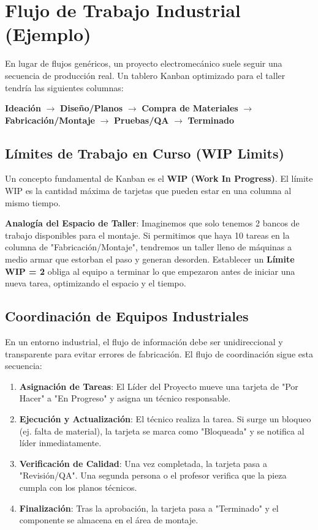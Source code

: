 \documentclass[../main]{subfiles}
\begin{document}
\section{Flujo de Trabajo Industrial (Ejemplo)}

En lugar de flujos genéricos, un proyecto electromecánico suele seguir una secuencia de producción real. Un tablero Kanban optimizado para el taller tendría las siguientes columnas:

\begin{center}
\textbf{Ideación} $\rightarrow$ \textbf{Diseño/Planos} $\rightarrow$ \textbf{Compra de Materiales} $\rightarrow$ \textbf{Fabricación/Montaje} $\rightarrow$ \textbf{Pruebas/QA} $\rightarrow$ \textbf{Terminado}
\end{center}

\subsection{Límites de Trabajo en Curso (WIP Limits)}

Un concepto fundamental de Kanban es el \textbf{WIP (Work In Progress)}. El límite WIP es la cantidad máxima de tarjetas que pueden estar en una columna al mismo tiempo.

\textbf{Analogía del Espacio de Taller}: Imaginemos que solo tenemos 2 bancos de trabajo disponibles para el montaje. Si permitimos que haya 10 tareas en la columna de "Fabricación/Montaje", tendremos un taller lleno de máquinas a medio armar que estorban el paso y generan desorden. Establecer un \textbf{Límite WIP = 2} obliga al equipo a terminar lo que empezaron antes de iniciar una nueva tarea, optimizando el espacio y el tiempo.

\subsection{Coordinación de Equipos Industriales}
En un entorno industrial, el flujo de información debe ser unidireccional y transparente para evitar errores de fabricación. El flujo de coordinación sigue esta secuencia:
\begin{enumerate}
    \item \textbf{Asignación de Tareas}: El Líder del Proyecto mueve una tarjeta de "Por Hacer" a "En Progreso" y asigna un técnico responsable.
    \item \textbf{Ejecución y Actualización}: El técnico realiza la tarea. Si surge un bloqueo (ej. falta de material), la tarjeta se marca como "Bloqueada" y se notifica al líder inmediatamente.
    \item \textbf{Verificación de Calidad}: Una vez completada, la tarjeta pasa a "Revisión/QA". Una segunda persona o el profesor verifica que la pieza cumpla con los planos técnicos.
    \item \textbf{Finalización}: Tras la aprobación, la tarjeta pasa a "Terminado" y el componente se almacena en el área de montaje.
\end{enumerate}
\end{document}
